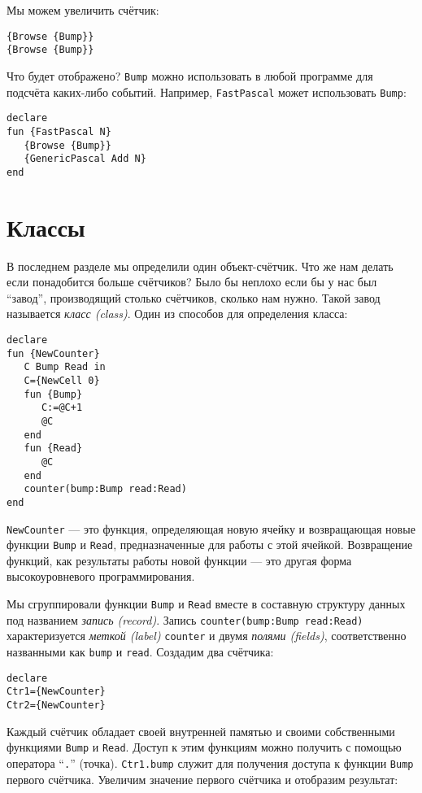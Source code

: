 Мы можем увеличить счётчик:

\begin{lstlisting}
{Browse {Bump}}
{Browse {Bump}}
\end{lstlisting}

Что будет отображено? \lstinline|Bump| можно использовать в любой программе для подсчёта каких-либо событий. Например, \lstinline|FastPascal| может использовать \lstinline|Bump|:

\begin{lstlisting}
declare
fun {FastPascal N}
   {Browse {Bump}}
   {GenericPascal Add N}
end
\end{lstlisting}

\section{Классы}

В последнем разделе мы определили один объект-счётчик. Что же нам делать если понадобится больше счётчиков? Было бы неплохо если бы у нас был ``завод'', производящий столько счётчиков, сколько нам нужно. Такой завод называется \emph{класс (class)}. Один из способов для определения класса:

\begin{lstlisting}
declare
fun {NewCounter}
   C Bump Read in
   C={NewCell 0}
   fun {Bump}
      C:=@C+1
      @C
   end
   fun {Read}
      @C
   end
   counter(bump:Bump read:Read)
end
\end{lstlisting}

\lstinline|NewCounter| --- это функция, определяющая новую ячейку и возвращающая новые функции \lstinline|Bump| и \lstinline|Read|, предназначенные для работы с этой ячейкой. Возвращение функций, как результаты работы новой функции --- это другая форма высокоуровневого программирования.

Мы сгруппировали функции \lstinline|Bump| и \lstinline|Read| вместе в составную структуру данных под названием \emph{запись (record)}. Запись \lstinline|counter(bump:Bump read:Read)| характеризуется \emph{меткой (label)} \lstinline|counter| и двумя \emph{полями (fields)}, соответственно названными как \lstinline|bump| и \lstinline|read|. Создадим два счётчика:

\begin{lstlisting}
declare
Ctr1={NewCounter}
Ctr2={NewCounter}
\end{lstlisting}

Каждый счётчик обладает своей внутренней памятью и своими собственными функциями \lstinline|Bump| и \lstinline|Read|. Доступ к этим функциям можно получить с помощью оператора ``\lstinline|.|'' (точка). \lstinline|Ctr1.bump| служит для получения доступа к функции \lstinline|Bump| первого счётчика. Увеличим значение первого счётчика и отобразим результат:


